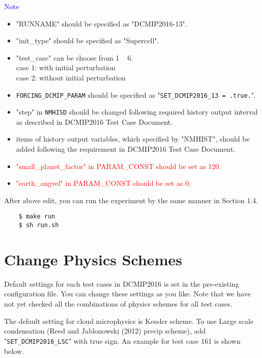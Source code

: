  \noindent \textcolor{blue}{{\sf Note}}
 \begin{itemize}
   \item "RUNNAME" should be specified as "DCMIP2016-13".
   \item "init\_type" should be specified as "Supercell".
   \item "test\_case" can be choose from 1 ~ 6.\\
          case 1: with initial perturbation \\
          case 2: without initial perturbation
   \item \verb|FORCING_DCMIP_PARAM| should be specified as "\verb|SET_DCMIP2016_13 = .true.|".
   \item "step" in \verb|NMHISD| should be changed following required history output interval
           as described in DCMIP2016 Test Case Document.
   \item items of history output variables, which specified by "NMHIST", should be added
         following the requirement in DCMIP2016 Test Case Document.
   \item \textcolor{red}{"small\_planet\_factor" in PARAM\_CONST should be set as 120}.
   \item \textcolor{red}{"earth\_angvel" in PARAM\_CONST should be set as 0}.
 \end{itemize}

 \noindent After above edit, you can run the experiment
 by the same manner in Section 1.4.
 \begin{verbatim}
    $ make run
    $ sh run.sh
 \end{verbatim}


\section{Change Physics Schemes}

 \noindent Default settings for each test cases in DCMIP2016 is set
 in the pre-existing configuration file. You can change these settings
 as you like. Note that we have not yet checked all the combinations of
 physics schemes for all test cases. \\



 \noindent The default setting for cloud microphysics is Kessler scheme.
 To use Large scale condensation (Reed and Jablonowski (2012) precip scheme),
 add "\verb|SET_DCMIP2016_LSC|" with true sign. An example for test case 161
 is shown below.

